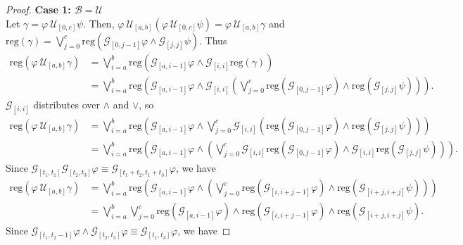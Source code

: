 \documentclass[runningheads]{llncs}
\renewcommand{\phi}{\varphi}
\begin{document}
\begin{proof}
\textbf{Case 1: $\mathbf{\mathcal{B} = \mathcal{U}}$}\\
\noindent Let $\gamma = \phi \ \mathcal{U}_{[0,c]} \psi$. Then,  $\phi \ \mathcal{U}_{[a,b]}(\phi \ \mathcal{U}_{[0,c]} \psi) = \phi \ \mathcal{U}_{[a,b]}\gamma$ and\\ $\text{reg}\left(\gamma\right) = \bigvee_{j=0}^{c} \text{reg}\left(\mathcal{G}_{[0,j-1]}\phi \land \mathcal{G}_{[j, j]}\psi\right).$ Thus
\begin{align*}
\text{reg}\left(\phi \ \mathcal{U}_{[a,b]}\gamma\right) &= \bigvee_{i=a}^{b} \text{reg}\left(\mathcal{G}_{[a,i-1]}\phi \land \mathcal{G}_{[i, i]}\text{reg}\left(\gamma\right)\right)\\
&= \bigvee_{i=a}^{b} \text{reg}\left(\mathcal{G}_{[a,i-1]}\phi \land  \mathcal{G}_{[i, i]}\left( \bigvee_{j=0}^{c} \text{reg}\left(\mathcal{G}_{[0,j-1]}\phi\right) \land \text{reg}\left(\mathcal{G}_{[j, j]}\psi\right) \right) \right).
\end{align*}
$\mathcal{G}_{[i, i]}$ distributes over $\land$ and $\lor$, so
\begin{align*}
\text{reg}\left(\phi \ \mathcal{U}_{[a,b]}\gamma\right) &= \bigvee_{i=a}^{b} \text{reg}\left(\mathcal{G}_{[a,i-1]}\phi \land  \bigvee_{j=0}^{c} \mathcal{G}_{[i, i]}\left( \text{reg}\left(\mathcal{G}_{[0,j-1]}\phi\right) \land \text{reg}\left(\mathcal{G}_{[j, j]}\psi\right) \right) \right) \\
&= \bigvee_{i=a}^{b} \text{reg}\left(\mathcal{G}_{[a,i-1]}\phi \land \left( \bigvee_{j=0}^{c} \mathcal{G}_{[i, i]}\text{reg}\left(\mathcal{G}_{[0,j-1]}\phi\right) \land \mathcal{G}_{[i, i]}\text{reg}\left(
\mathcal{G}_{[j, j]}\psi \right) \right) \right).
\end{align*}
Since $\mathcal{G}_{[t_1,t_1]} \mathcal{G}_{[t_2,t_3]} \phi \equiv \mathcal{G}_{[t_1+t_2,t_1+t_3]} \phi$, we have
\begin{align*}
\text{reg}\left(\phi \ \mathcal{U}_{[a,b]}\gamma\right) &= \bigvee_{i=a}^{b} \text{reg}\left(\mathcal{G}_{[a,i-1]}\phi \land \left( \bigvee_{j=0}^{c} \text{reg}\left(\mathcal{G}_{[i,i+j-1]}\phi\right) \land \text{reg}\left(\mathcal{G}_{[i+j, i+j]}\psi \right) \right) \right) \\
&= \bigvee_{i=a}^{b}  \bigvee_{j=0}^{c} \text{reg}\left(\mathcal{G}_{[a,i-1]}\phi\right) \land  \text{reg}\left(\mathcal{G}_{[i,i+j-1]}\phi\right) \land \text{reg}\left(\mathcal{G}_{[i+j, i+j]}\psi \right).
\end{align*}
Since $\mathcal{G}_{[t_1,t_2-1]}\phi \land \mathcal{G}_{[t_2,t_3]} \phi \equiv \mathcal{G}_{[t_1,t_3]} \phi$, we have

\end{proof}
\end{document}
